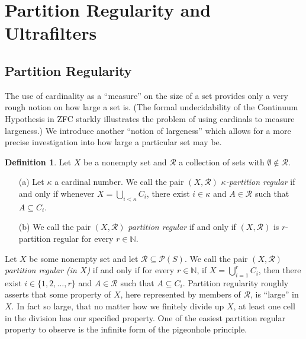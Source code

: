 \documentclass[12pt]{article}
\theoremstyle{plain}
\theoremstyle{definition}
\newtheorem*{defn}{Definition}
\newcommand{\bbN}{\mathbb{N}}
\newcommand{\calP}{\mathcal{P}}
\newcommand{\calR}{\mathcal{R}}
\begin{document}
\section{Partition Regularity and Ultrafilters}

\subsection{Partition Regularity}
The use of cardinality as a ``measure'' on the size of a set provides
only a very rough notion on how large a set is.
(The formal undecidability of the Continuum Hypothesis in ZFC starkly
illustrates the problem of using cardinals to measure largeness.)
We introduce another ``notion of largeness'' which allows for a more
precise investigation into how large a particular set may be.

\begin{defn}
  Let $X$ be a nonempty set and $\calR$ a collection of sets with
  $\emptyset\not\in \calR$. 
  \begin{itemize}
    \item[(a)] Let $\kappa$ a cardinal number. 
      We call the pair $(X, \calR)$ \textsl{\mbox{$\kappa$-partition}
        regular} if and only if whenever $X = \bigcup_{i < \kappa}
      C_i$, there exist $i \in \kappa$ and $A \in \calR$ such that $A
      \subseteq C_i$.

    \item[(b)] We call the pair $(X, \calR)$ \textsl{partition
        regular} if and only if $(X, \calR)$ is \mbox{$r$-partition}
      regular for every $r \in \bbN$.
  \end{itemize}
\end{defn}


Let $X$ be some nonempty set and let $\calR \subseteq \calP(S)$.  
We call the pair $(X, \calR)$ \textsl{partition regular (in $X$)} if and
only if for every $r \in \bbN$, if $X = \bigcup_{i=1}^r C_i$, then
there exist $i \in \{1, 2, \ldots, r\}$ and $A \in \calR$ such that $A
\subseteq C_i$.
Partition regularity roughly asserts that some property of $X$, here
represented by members of $\calR$, is ``large'' in $X$.
In fact so large, that no matter how we finitely divide up $X$, at
least one cell in the division has our specified property. 
One of the easiest partition regular property to observe is the
infinite form of the pigeonhole principle.
\end{document}
